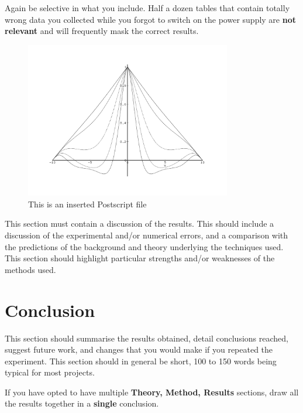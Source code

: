 \documentclass[a4paper,12pt]{article}
\begin{document}
 
Again be selective in what you include. Half a dozen
tables that contain totally wrong data you collected while you forgot
to switch on the power supply are {\bf not relevant} and will frequently
mask the correct results. 
%
%
\begin{figure}[htb]     %
        \begin{center}
                \leavevmode             %
                \includegraphics[width=9cm]{otf-eps-converted-to.pdf}
\end{center}
\caption{This is an inserted Postscript file}
\end{figure}

This section must contain a discussion of the results. This should
include a discussion of the experimental and/or numerical errors, and a
comparison with the predictions of the background and theory underlying
the techniques used. This section should highlight particular strengths
and/or weaknesses of the methods used.

 
\section{Conclusion}
This section should summarise the results obtained, detail
conclusions reached, suggest future work, and changes that you would make if you repeated the
experiment. This section should in general be short, 100 to 150 words
being typical for most projects.
\par\noindent
If you have opted to have multiple {\bf Theory, Method, Results}
sections, draw all the results together in a {\bf single} conclusion.
\end{document}
